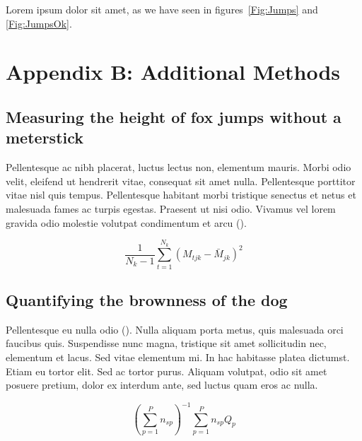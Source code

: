 \documentclass[11pt]{article}
\begin{document}
Lorem ipsum dolor sit amet, as we have seen in figures~\ref{Fig:Jumps} and \ref{Fig:JumpsOk}.

\newpage{}
\renewcommand{\theequation}{B\arabic{equation}}
\renewcommand{\thetable}{B\arabic{table}}
\setcounter{equation}{0}  %
\setcounter{table}{0}

\section*{Appendix B: Additional Methods}

\subsection*{Measuring the height of fox jumps without a meterstick}

Pellentesque ac nibh placerat, luctus lectus non, elementum mauris. 
Morbi odio velit, eleifend ut hendrerit vitae, consequat sit amet 
nulla. Pellentesque porttitor vitae nisl quis tempus. Pellentesque 
habitant morbi tristique senectus et netus et malesuada fames ac 
turpis egestas. Praesent ut nisi odio. Vivamus vel lorem gravida 
odio molestie volutpat condimentum et arcu (). 

\begin{equation}
{ \frac{1}{N_k-1} \sum \limits_{t=1}^{N_k} (M_{tjk} - \bar{M}_{jk})^2}
\end{equation}

\subsection*{Quantifying the brownness of the dog}

Pellentesque eu nulla odio (). Nulla aliquam porta metus, quis malesuada orci faucibus quis. Suspendisse nunc magna, tristique sit amet sollicitudin nec, elementum et lacus. Sed vitae elementum mi. In hac habitasse platea dictumst. Etiam eu tortor elit. Sed ac tortor purus. Aliquam volutpat, odio sit amet posuere pretium, dolor ex interdum ante, sed luctus quam eros ac nulla. 

\begin{equation}
{ (\sum \limits_{p=1}^P {n_{sp}})^{-1}\sum \limits_{p=1}^P {n_{sp}Q_{p}}}
\end{equation}

\newpage{}

%
%
\end{document}
